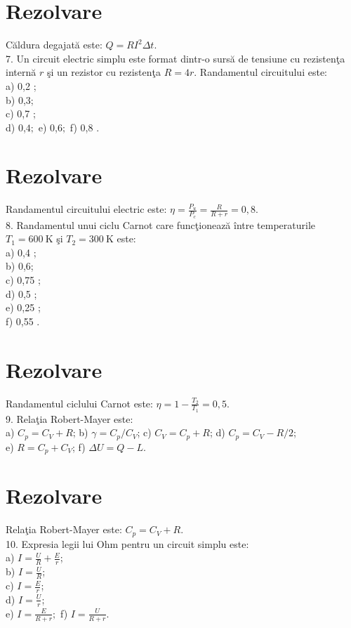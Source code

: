 \section*{Rezolvare}
Căldura degajată este: $Q=R I^{2} \Delta t$.\\
7. Un circuit electric simplu este format dintr-o sursă de tensiune cu rezistenţa internă $r$ şi un rezistor cu rezistenţa $R=4 r$. Randamentul circuitului este:\\
a) 0,2 ;\\
b) 0,3;\\
c) 0,7 ;\\
d) 0,$4 ;$ e) 0,$6 ;$ f) 0,8 .

\section*{Rezolvare}
Randamentul circuitului electric este: $\eta=\frac{P_{u}}{P_{c}}=\frac{R}{R+r}=0,8$.\\
8. Randamentul unui ciclu Carnot care funcţionează între temperaturile $T_{1}=600 \mathrm{~K}$ şi $T_{2}=300 \mathrm{~K}$ este:\\
a) 0,4 ;\\
b) 0,6;\\
c) 0,75 ;\\
d) 0,5 ;\\
e) 0,25 ;\\
f) 0,55 .

\section*{Rezolvare}
Randamentul ciclului Carnot este: $\eta=1-\frac{T_{2}}{T_{1}}=0,5$.\\
9. Relaţia Robert-Mayer este:\\
a) $C_{p}=C_{V}+R$; b) $\gamma=C_{p} / C_{V}$; c) $C_{V}=C_{p}+R$; d) $C_{p}=C_{V}-R / 2$;\\
e) $R=C_{p}+C_{V}$; f) $\Delta U=Q-L$.

\section*{Rezolvare}
Relaţia Robert-Mayer este: $C_{p}=C_{V}+R$.\\
10. Expresia legii lui Ohm pentru un circuit simplu este:\\
a) $I=\frac{U}{R}+\frac{E}{r}$;\\
b) $I=\frac{U}{R}$;\\
c) $I=\frac{E}{r}$;\\
d) $I=\frac{U}{r}$;\\
e) $I=\frac{E}{R+r} ;$ f) $I=\frac{U}{R+r}$.

